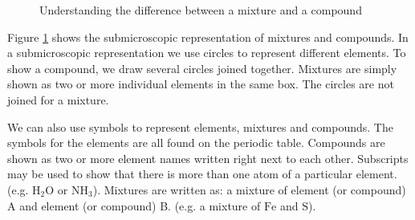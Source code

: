 	\begin{figure}[H] %
    \begin{center}
\caption{Understanding the difference between a mixture and a compound}
\label{fig:classification:mixture and compound}
    \end{center}
 \end{figure}   
\label{m38708*eip-487} Figure \ref{fig:classification:mixture and compound} shows the submicroscopic representation of mixtures and compounds. In a submicroscopic representation we use circles to represent different elements. To show a compound, we draw several circles joined together. Mixtures are simply shown as two or more individual elements in the same box. The circles are not joined for a mixture.\par 
\label{m38708*id0124}We can also use symbols to represent elements, mixtures and compounds. The symbols for the elements are all found on the periodic table. Compounds are shown as two or more element names written right next to each other. Subscripts may be used to show that there is more than one atom of a particular element. (e.g. $\mathrm{H}{}_{2}\mathrm{O}$ or $\mathrm{NH}_{3}$). Mixtures are written as: a mixture of element (or compound) A and element (or compound) B. (e.g. a mixture of $\mathrm{Fe}$ and $\mathrm{S}$).\par 
